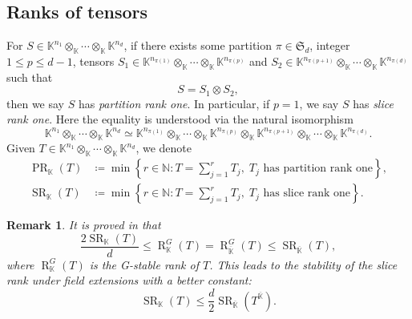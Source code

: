 \documentclass[10pt]{article}
\newtheorem{remark}[theorem]{Remark}
\theoremstyle{definition}
\DeclareMathOperator{\sr}{SR}
\DeclareMathOperator{\pr}{PR}
\DeclareMathOperator{\R}{R}
\begin{document}
\subsection{Ranks of tensors}
For $S \in \mathbb{K}^{n_1} \otimes_{\mathbb{K}} \cdots \otimes_{\mathbb{K}} \mathbb{K}^{n_d}$,  if there exists some partition $\pi \in \mathfrak{S}_d$,  integer $1 \le p \le d-1$,  tensors $S_1 \in \mathbb{K}^{n_{\pi(1)}} \otimes_{\mathbb{K}} \cdots \otimes_{\mathbb{K}}  \mathbb{K}^{n_{\pi(p)}}$ and $S_2 \in \mathbb{K}^{n_{\pi(p+1)}} \otimes_{\mathbb{K}} \cdots \otimes_{\mathbb{K}} \mathbb{K}^{n_{\pi(d)}}$ such that
\[
S  = S_1 \otimes S_2,
\]
then we say $S$ has \emph{partition rank one}.  In particular,  if $p = 1$,  we say $S$ has \emph{slice rank one}.  Here the equality is understood via the natural isomorphism 
\[
\mathbb{K}^{n_1} \otimes_{\mathbb{K}} \cdots \otimes_{\mathbb{K}} \mathbb{K}^{n_d} \simeq 
\mathbb{K}^{n_{\pi(1)}} \otimes_{\mathbb{K}} \cdots \otimes_{\mathbb{K}}  \mathbb{K}^{n_{\pi(p)}}  \otimes_{\mathbb{K}}   \mathbb{K}^{n_{\pi(p+1)}} \otimes_{\mathbb{K}} \cdots \otimes_{\mathbb{K}}  \mathbb{K}^{n_{\pi(d)}}. 
\]
Given $T \in \mathbb{K}^{n_1} \otimes_{\mathbb{K}}  \cdots \otimes_{\mathbb{K}} \mathbb{K}^{n_d}$,  we denote 
\begin{align}
\pr_{\mathbb{K}}(T) &\coloneqq \min \left\lbrace
r \in \mathbb{N}: T = \sum_{j=1}^r T_j,\; T_j \text{~has partition rank one}
\right\rbrace,  \label{eq:PR} \\
\sr_{\mathbb{K}}(T) &\coloneqq \min \left\lbrace
r \in \mathbb{N}: T = \sum_{j=1}^r T_j,\; T_j \text{~has slice rank one}
\right\rbrace.  \label{eq:SR}
\end{align}
\setcounter{section}{5}\setcounter{theorem}{4}\setcounter{equation}{21}
\begin{remark}\label{rem4-5}
It is proved in \cite{derksen2022g} that
\[
\frac{2 \sr_{\mathbb{K}}(T)}{d} \le \R^G_{\mathbb{K}}(T) = \R^G_{\overline{\mathbb{K}}}(T) \le \sr_{\overline{\mathbb{K}}}(T),
\]
where $\R^G_{\mathbb{K}}(T)$ is the G-stable rank of $T$.  This leads to the stability of the slice rank under field extensions with a better constant:
\begin{equation}\label{rem4-5:eq1}
\sr_{\mathbb{K}}(T)\le \frac{d}{2} \sr_{\overline{\mathbb{K}}}\left( T^{\overline{\mathbb{K}}} \right).
\end{equation}
\end{remark}
\setcounter{section}{5}\setcounter{theorem}{7}\setcounter{equation}{23}
\end{document}

